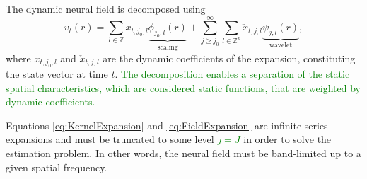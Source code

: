 \documentclass[11pt,draftcls,onecolumn,peerreview]{IEEEtran}
\newcommand{\dean}[1]{\textcolor{green}{#1}}
\begin{document}
The dynamic neural field is decomposed using
\begin{equation}
 v_t\left(r\right)=\sum_{l \in \mathbb{Z}}x_{t,j_{0},l} \underbrace{\phi_{j_0,l}\left(r\right)}_{\text{scaling}} + \sum_{j\geq j_0}^{\infty} \sum_{l \in \mathbb{Z}^n} \check{x}_{t,j,l} \underbrace{\psi_{j,l}\left(r\right)}_{\text{wavelet}},
\label{eq:FieldExpansion}
\end{equation}
where $x_{t,j_{0},l}$ and $\check{x}_{t,j,l} $ are the dynamic coefficients of the expansion, constituting the state vector at time $t$. \dean{The decomposition enables a separation of the static spatial characteristics, which are considered static functions, that are weighted by dynamic coefficients.  }

Equations \ref{eq:KernelExpansion} and \ref{eq:FieldExpansion} are infinite series expansions and must be truncated to some level \dean{$j=J$} in order to solve the estimation problem. In other words, the neural field must be band-limited up to a given spatial frequency. 
\end{document}
